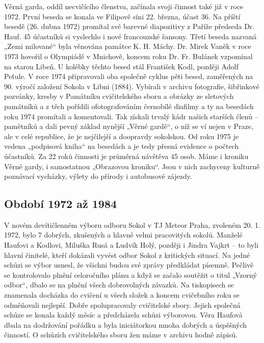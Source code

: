 Věrná garda, oddíl necvičícího členstva, začínala svoji činnost také již
v roce 1972. První beseda se konala ve Filipově síni 22. března, účast
36. Na příští besedě (26. dubna 1972) promítal své barevné diapozitivy z
Paříže předseda Dr. Hauf. 45 účastníků si vyslechlo i nové francouzské
šansony. Třetí beseda nazvaná „Zemi milované`` byla věnována památce K.
H. Máchy. Dr. Mirek Vaněk v roce 1973 hovořil o Olympiádě v Mnichově,
koncem roku Dr. Fr. Bulánek vzpomínal na starou Libeň. U kolébky těchto
besed stál František Kodl, později Adolf Peťule. V roce 1974
připravovali oba společně cyklus pěti besed, zaměřených na 90. výročí
založení Sokola v Libni (1884). Vybírali v archivu fotografie,
šibřinkové pozvánky, kresby v Památníku cvičitelského sboru a obrázky ze
sletových památníků a z těch pořídili ofotografováním černobílé diafilmy
a ty na besedách roku 1974 promítali a komentovali. Tak získali trvalý
kádr našich starších členů -- pamětníků a dali pevný základ nynější
„Věrné gardě``, o níž se ví nejen v Praze, ale v celé republice, že je
nejčilejší a doopravdy sokolskou. Od roku 1975 je vedena „podpisová
kniha`` na besedách a je tedy přesná evidence o počtech účastníků. Za 22
roků činnosti je průměrná návštěva 45 osob. Máme i kroniku Věrné gardy,
i samostatnou „Obrazovou kroniku``. Jsou v nich zachyceny kulturně
poznávací vycházky, výlety do přírody i autobusové zájezdy.

\subsection{Období 1972 až 1984}\label{obdobuxed-1972-aux17e-1984}

V novém devítičlenném výboru odboru Sokol v TJ Meteor Praha, zvoleném
20. 1. 1972, bylo 7 dobrých, zkušených a hlavně velmi pracovitých
sokolů. Manželé Haufovi a Kodlovi, Miluška Rusá a Ludvík Holý, později i
Jindra Vajkrt -- to byli hlavní činitelé, kteří dokázali vyvést odbor
Sokol z kritických situací. Na jedné schůzi se výbor usnesl, že všichni
budou své zprávy předkládat písemně. Pečlivě se kontrolovalo plnění
celoročního plánu a když se začalo soutěžit o titul „Vzorný odbor``,
dbalo se na plnění všech dobrovolných závazků. Na tiskopisech se
znamenala docházka do cvičení u všech složek a koncem cvičebního roku se
odměňovali nejlepší. Dobře spolupracovaly cvičitelské sbory. Jejich
společná schůze se konala každý měsíc a předcházela schůzi výborovou.
Věra Haufová dbala na dodržování pořádku a byla iniciátorkou mnoha
dobrých a úspěšných činností. O schůzích cvičitelského sboru žen máme v
archivu hodně zápisů.

